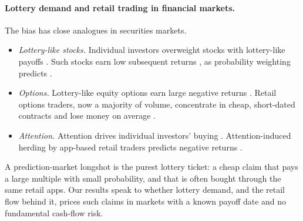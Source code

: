 \paragraph{Lottery demand and retail trading in financial markets.} The bias has close
analogues in securities markets.
\begin{itemize}
  \item \emph{Lottery-like stocks.} Individual investors overweight stocks with lottery-like
  payoffs \citep{kumar2009}. Such stocks earn low subsequent returns \citep{bali2011}, as
  probability weighting predicts \citep{barberis2008}.
  \item \emph{Options.} Lottery-like equity options earn large negative returns
  \citep{boyer2014}. Retail options traders, now a majority of volume, concentrate in cheap,
  short-dated contracts and lose money on average \citep{bryzgalova2023}.
  \item \emph{Attention.} Attention drives individual investors' buying \citep{barberodean2008}.
  Attention-induced herding by app-based retail traders predicts negative returns
  \citep{barber2022}.
\end{itemize}
A prediction-market longshot is the purest lottery ticket: a cheap claim that pays a large
multiple with small probability, and that is often bought through the same retail apps. Our
results speak to whether lottery demand, and the retail flow behind it, prices such claims in
markets with a known payoff date and no fundamental cash-flow risk.
